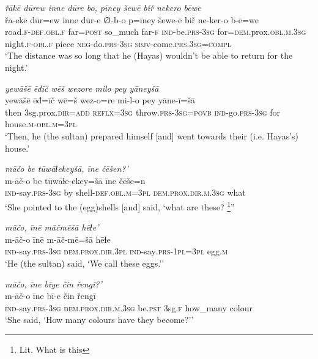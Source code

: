 \ea \label{ŽH.71}
\textit{řākē dūrew inne dūre bo, pīney šewē biř nekero bēwe} \\ 
\gll řā-ekē dūr=ew inne dūr-e ∅-b-o p=īney šewe-ē biř ne-ker-o b-ē=we \\ 
 road\textsc{\textsc{.f}}\textsc{-def}\textsc{.obl}\textsc{\textsc{.f}} far\textsc{=\textsc{post}} so\_much far\textsc{-f} \textsc{ind-}be\textsc{.prs}\textsc{-3sg} for\textsc{=dem}.prox\textsc{.obl}\textsc{.m}\textsc{.3sg} night\textsc{\textsc{.f}}\textsc{-obl}\textsc{\textsc{.f}} piece \textsc{neg-}do\textsc{.prs}\textsc{-3sg} \textsc{sbjv-}come\textsc{.prs}\textsc{.3sg}\textsc{=compl} \\ 
\glt `The distance was so long that he (Hayas) wouldn’t be able to return for the night.'
\z 
 
\ea \label{ŽH.72}
\textit{yewāšē ēđīč wēš wezore milo pey yāneyšā} \\ 
\gll yewāšē ēđ=īč wē=š wez-o=re mi-l-o pey yāne-ī=šā \\ 
 then 3sg.prox\textsc{.dir}\textsc{=add} \textsc{reflx}\textsc{=3sg} throw\textsc{.prs}\textsc{-3sg}\textsc{=\textsc{povb}} \textsc{ind-}go\textsc{.prs}\textsc{-3sg} for house\textsc{.m}\textsc{-obl}\textsc{.m}\textsc{=3pl} \\ 
\glt `Then, he (the sultan) prepared himself [and] went towards their (i.e. Hayas’s) house.'
\z 
 
\ea \label{ŽH.86}
\textit{māčo be tūwāɫekeyšā, īne čēšen?’} \\ 
\gll m-āč-o be tūwāɫe-ekey=šā īne čēše=n \\ 
 \textsc{ind-}say\textsc{.prs}\textsc{-3sg} by shell\textsc{-def}\textsc{.obl}\textsc{.m}\textsc{=3pl} \textsc{dem.prox}\textsc{.dir}\textsc{.m}\textsc{.3sg} what \\ 
\glt `She pointed to the (egg)shells [and] said, ‘what are these? \footnote{Lit. What is this}''
\z 
 
\ea \label{ŽH.87}
\textit{māčo, īnē māčmēšā hēɫe’} \\ 
\gll m-āč-o īnē m-āč-mē=šā hēɫe \\ 
 \textsc{ind-}say\textsc{.prs}\textsc{-3sg} \textsc{dem.prox}\textsc{.dir}\textsc{.3pl} \textsc{ind-}say\textsc{.prs}\textsc{-1pl}\textsc{=3pl} egg\textsc{.m} \\ 
\glt `He (the sultan) said, ‘We call these eggs.’'
\z 
 
\ea \label{ŽH.88}
\textit{māčo, īne bīye čin řengī?’} \\ 
\gll m-āč-o īne bī-e čin řengī \\ 
 \textsc{ind-}say\textsc{.prs}\textsc{-3sg} \textsc{dem.prox}\textsc{.dir}\textsc{.m}\textsc{.3sg} be\textsc{.pst} 3sg\textsc{\textsc{.f}} how\_many colour \\ 
\glt `She said, ‘How many colours have they become?’'
\z 
 

